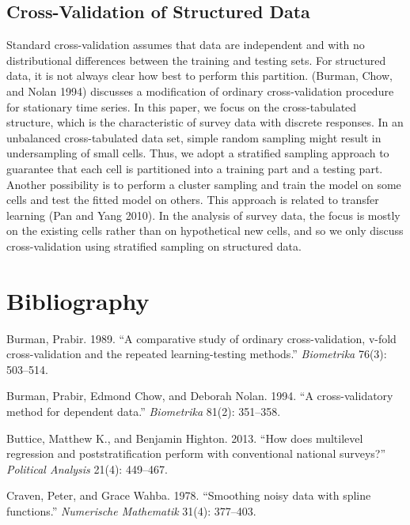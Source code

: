 \documentclass[11pt,article,oneside]{memoir}
\begin{document}
\subsection{Cross-Validation of Structured Data}

Standard cross-validation assumes that data are independent and with no
distributional differences between the training and testing sets. For
structured data, it is not always clear how best to perform this
partition. (Burman, Chow, and Nolan 1994) discusses a modification of
ordinary cross-validation procedure for stationary time series. In this
paper, we focus on the cross-tabulated structure, which is the
characteristic of survey data with discrete responses. In an unbalanced
cross-tabulated data set, simple random sampling might result in
undersampling of small cells. Thus, we adopt a stratified sampling
approach to guarantee that each cell is partitioned into a training part
and a testing part. Another possibility is to perform a cluster sampling
and train the model on some cells and test the fitted model on others.
This approach is related to transfer learning (Pan and Yang 2010). In
the analysis of survey data, the focus is mostly on the existing cells
rather than on hypothetical new cells, and so we only discuss
cross-validation using stratified sampling on structured data.

\section*{Bibliography}\label{bibliography}

Burman, Prabir. 1989. ``A comparative study of ordinary
cross-validation, v-fold cross-validation and the repeated
learning-testing methods.'' \emph{Biometrika} 76(3): 503--514.

Burman, Prabir, Edmond Chow, and Deborah Nolan. 1994. ``A
cross-validatory method for dependent data.'' \emph{Biometrika} 81(2):
351--358.

Buttice, Matthew K., and Benjamin Highton. 2013. ``How does multilevel
regression and poststratification perform with conventional national
surveys?'' \emph{Political Analysis} 21(4): 449--467.

Craven, Peter, and Grace Wahba. 1978. ``Smoothing noisy data with spline
functions.'' \emph{Numerische Mathematik} 31(4): 377--403.
\end{document}

